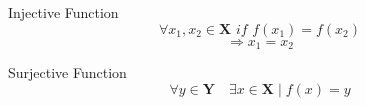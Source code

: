 \documentclass[10pt]{article}
\begin{document}
Injective Function
$$ \forall x_1, x_2 \in \mathbf{X}  \textit{ if } f(x_1) = f(x_2) $$
$$ \Rightarrow x_1 = x_2 $$

Surjective Function
$$ \forall y \in \mathbf{Y}\quad \exists x \in \mathbf{X} \mid f(x) = y  $$
\end{document}
